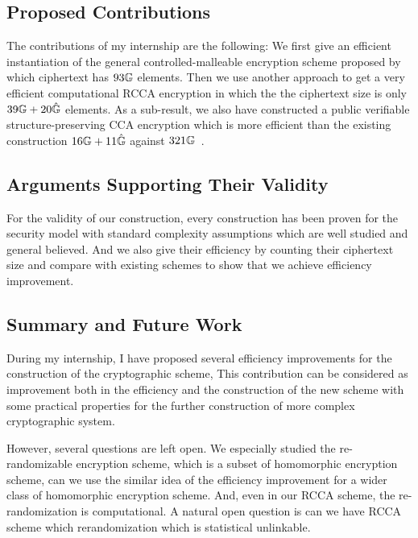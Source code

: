 \subsection*{Proposed Contributions}
The contributions of my internship are the following:
We first give an efficient instantiation of the general controlled-malleable encryption scheme proposed by~\cite{DBLP:conf/eurocrypt/ChaseKLM12} which ciphertext has $93\mathbb{G}$ elements.
Then we use another approach to get a very efficient computational RCCA encryption in which the the ciphertext size is only $39\mathbb{G} + 20 \hat{\mathbb{G}}$ elements.
As a sub-result, we also have constructed a public verifiable structure-preserving CCA encryption which is more efficient than the existing construction $16\mathbb{G} + 11\hat{\mathbb{G}}$ against $321\mathbb{G}$~\cite{DBLP:conf/pkc/AbeDKNO13}.

\subsection*{Arguments Supporting Their Validity}
For the validity of our construction,
every construction has been proven for the security model with standard complexity assumptions which are well studied and general believed.
And we also give their efficiency by counting their ciphertext size and compare with existing schemes to show that we achieve efficiency improvement.

\subsection*{Summary and Future Work}
During my internship, I have proposed several efficiency improvements for the construction of the cryptographic scheme,
This contribution can be considered as improvement both in the efficiency and the construction of the new scheme with some practical properties for the further construction of more complex cryptographic system.

However, several questions are left open. 
We especially studied the re-randomizable encryption scheme, which is a subset of homomorphic encryption scheme,
can we use the similar idea of the efficiency improvement for a wider class of homomorphic encryption scheme.
And, even in our RCCA scheme, the re-randomization is computational.
A natural open question is can we have RCCA scheme which rerandomization which is statistical unlinkable.


